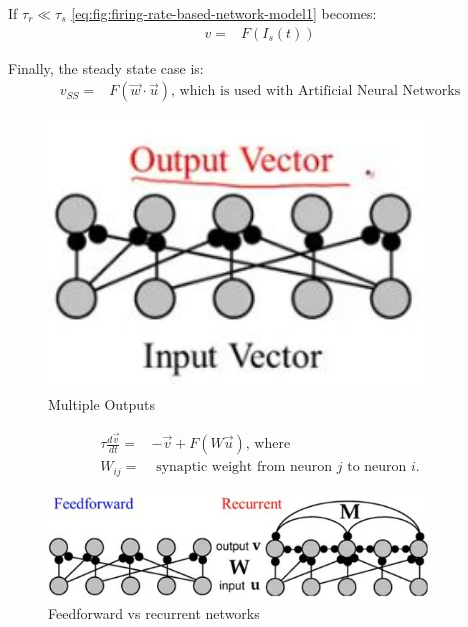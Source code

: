 \documentclass[]{article}
\begin{document}
If $\tau_r \ll \tau_s$ \eqref{eq:fig:firing-rate-based-network-model1} becomes:
\begin{align*}
	v =&  F(I_s(t))
\end{align*}

Finally, the steady state case is:
\begin{align*}
	v_{SS} =& F(\vec{w} \cdot \vec{u}) \text{, which is used with Artificial Neural Networks}
\end{align*}

\begin{figure}[H]
	\begin{center}
		\caption{Multiple Outputs}
		\includegraphics[width=0.9\textwidth]{multiple-outputs}
	\end{center}
\end{figure}

\begin{align*}
	\tau\frac{d\vec{v}}{dt} =& -\vec{v} + F(W \vec{u}) \text{, where}\\
	W_{ij} =& \text{ synaptic weight from neuron $j$ to neuron $i$.}
\end{align*}

\begin{figure}[H]
	\begin{center}
		\caption{Feedforward vs recurrent networks}
		\includegraphics[width=0.9\textwidth]{feedforward-vs-recurrent}
	\end{center}
\end{figure}
\end{document}
